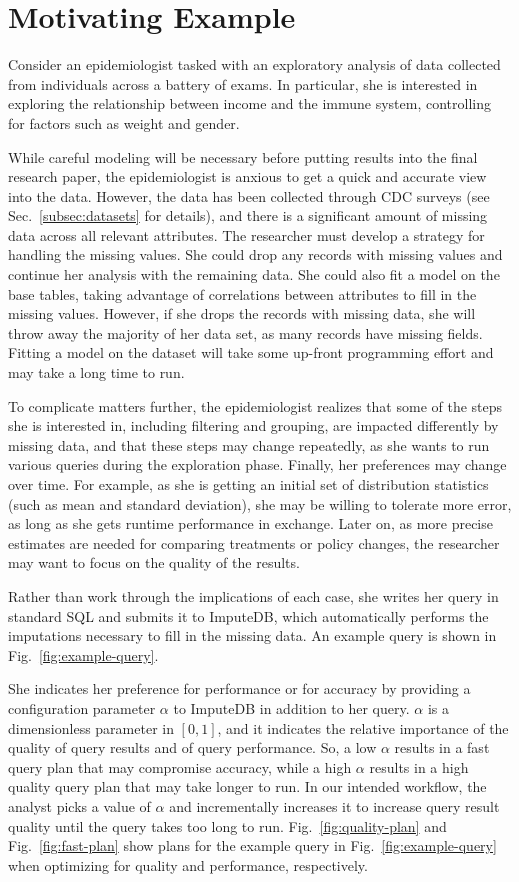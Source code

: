 \section{Motivating Example}
Consider an epidemiologist tasked with an 
exploratory analysis of data collected from individuals across
a battery of exams. In particular, she is interested in exploring
the relationship between income and the immune system,
controlling for factors such as weight and gender.

While careful modeling will be necessary before putting
results into the final research paper, the epidemiologist is anxious
to get a quick and accurate view into the data. However,
the data has been collected through CDC surveys (see Sec.~\ref{subsec:datasets} for details),
and there is a significant amount of missing data across all
relevant attributes. The researcher must develop a strategy
for handling the missing values. She could drop any records with
missing values and continue her analysis with the remaining data.
She could also fit a model on the base tables, taking advantage of correlations between attributes to fill in the missing values.
However, if she drops the records with missing data, she will throw away the majority of her data set, as many records have missing fields.
Fitting a model on the dataset will take some up-front programming effort and may take a long time to run.

To complicate matters further, the epidemiologist realizes that
some of the steps she is interested in, including filtering and grouping,
are impacted differently by missing data, and that these steps may change
repeatedly, as she wants to run various queries during the exploration phase.
Finally, her preferences may change over time. For example, as she is getting an initial
set of distribution statistics (such as mean and standard deviation), she may be willing to tolerate more error, as long as she gets runtime performance in exchange. Later on,
as more precise estimates are needed for comparing treatments or policy changes, the researcher
may want to focus on the quality of the results.

Rather than work through the implications of each case, she writes her query in standard SQL and submits it to ImputeDB, which automatically performs the imputations necessary to fill in the missing data.
An example query is shown in Fig.~\ref{fig:example-query}.

She indicates her preference for performance or for accuracy by providing a configuration parameter $\alpha$ to ImputeDB in addition to her query.
$\alpha$ is a dimensionless parameter in $[0,1]$, and it indicates the relative importance of the quality of query results and of query performance.
So, a low $\alpha$ results in a fast query plan that may compromise accuracy, while a high $\alpha$ results in a high quality query plan that may take longer to run.
In our intended workflow, the analyst picks a value of $\alpha$ and incrementally increases it to increase query result quality until the query takes too long to run.
Fig.~\ref{fig:quality-plan} and Fig.~\ref{fig:fast-plan} show plans for the example query in Fig.~\ref{fig:example-query} when optimizing for quality and performance, respectively.

